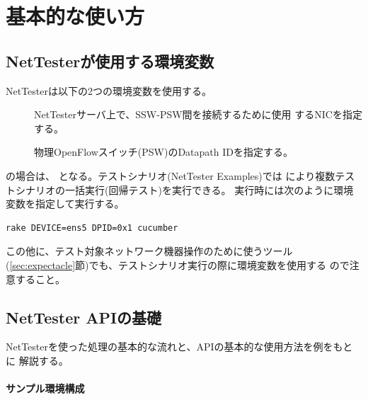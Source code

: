  \section{基本的な使い方}
 \label{sec:basic-usage}

  \subsection{NetTesterが使用する環境変数}
  \label{sec:nettester-envvar}

NetTesterは以下の2つの環境変数を使用する。
\begin{description}
 \item[] NetTesterサーバ上で、SSW-PSW間を接続するために使用
            するNICを指定する。
 \item[] 物理OpenFlowスイッチ(PSW)のDatapath IDを指定する。
\end{description}

の場合は、
となる。テストシナリオ(NetTester Examples)では
により複数テストシナリオの一括実行(回帰テスト)を実行できる。
実行時には次のように環境変数を指定して実行する。
\begin{lstlisting}
rake DEVICE=ens5 DPID=0x1 cucumber
\end{lstlisting}

この他に、テスト対象ネットワーク機器操作のために使うツール
(\ref{sec:expectacle}節)でも、テストシナリオ実行の際に環境変数を使用する
ので注意すること。

  \subsection{NetTester APIの基礎}
  \label{sec:nettester-api-basics}

NetTesterを使った処理の基本的な流れと、APIの基本的な使用方法を例をもとに
解説する。

\paragraph{サンプル環境構成}

